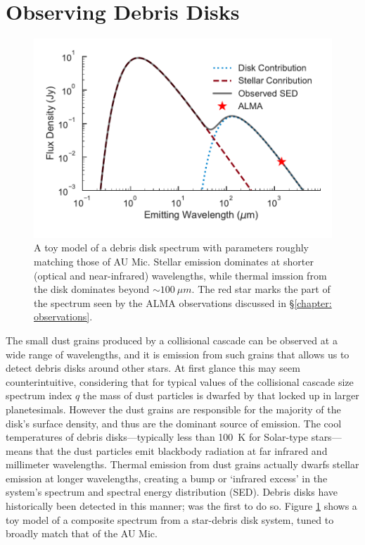 \documentclass[12pt,oneside]{book}
\begin{document}
\section{Observing Debris Disks}
\label{observing intro}

\begin{figure}
  \includegraphics[width=\linewidth]{../figures/disk_SED}
  \caption{
  A toy model of a debris disk spectrum with parameters roughly matching those of AU Mic. 
  Stellar emission dominates at shorter (optical and near-infrared) wavelengths, while thermal imssion from the disk dominates beyond $\sim \SI{100}{\mu m}$.
  The red star marks the part of the spectrum seen by the ALMA observations discussed in \S \ref{chapter: observations}.
  }
  \label{fig: SED}
\end{figure}

The small dust grains produced by a collisional cascade can be observed at a wide range of wavelengths, and it is emission from such grains that allows us to detect debris disks around other stars.
At first glance this may seem counterintuitive, considering that for typical values of the collisional cascade size spectrum index $q$ the mass of dust particles is dwarfed by that locked up in larger planetesimals.
However the dust grains are responsible for the majority of the disk's surface density, and thus are the dominant source of emission.
The cool temperatures of debris disks---typically less than \SI{100}{K} for Solar-type stars---means that the dust particles emit blackbody radiation at far infrared and millimeter wavelengths.
Thermal emission from dust grains actually dwarfs stellar emission at longer wavelengths, creating a bump or `infrared excess' in the system's spectrum and spectral energy distribution (SED).
Debris disks have historically been detected in this manner; \cite{aumann84} was the first to do so.
Figure \ref{fig: SED} shows a toy model of a composite spectrum from a star-debris disk system, tuned to broadly match that of the AU Mic.
\end{document}

